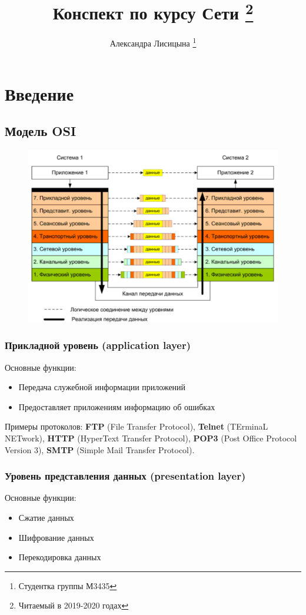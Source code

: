 \documentclass[10pt,a4paper,oneside,titlepage]{report}
\title{Конспект по курсу Сети \thanks{Читаемый  в 2019-2020 годах}}
\author{Александра Лисицына \thanks{Студентка группы М3435}}
\theoremstyle{defenition}
\begin{document}
	
\maketitle

\tableofcontents

\clearpage	

\chapter{Введение}

\section{Модель OSI}

\begin{figure}[h!]
	\centering
	\includegraphics[width=0.4\linewidth]{pictures/ModelOSI}
	\caption[Модель OSI]{}
	\label{fig:modelosi}
\end{figure}

\subsection{Прикладной уровень (application layer)}

Основные функции:
\begin{itemize}
	\item Передача служебной информации приложений
	\item Предоставляет приложениям информацию об ошибках
\end{itemize}

Примеры протоколов: {\bfseries FTP} (File Transfer Protocol), {\bfseries Telnet} (TErminaL NETwork), {\bfseries HTTP} (HyperText Transfer Protocol), {\bfseries POP3} (Post Office Protocol Version 3), {\bfseries SMTP} (Simple Mail Transfer Protocol).

\subsection{Уровень представления данных (presentation layer)}

Основные функции:
\begin{itemize}
	\item Сжатие данных
	\item Шифрование данных
	\item Перекодировка данных
\end{itemize}
\end{document}
